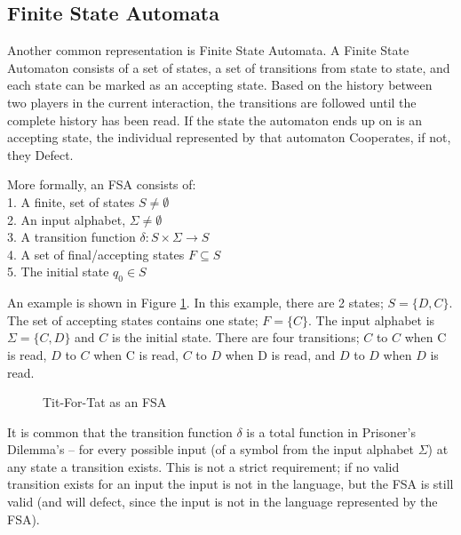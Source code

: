 \documentclass[a4paper,11pt,bcshonoursthesis,singlespace,oneside,thesisdraft,pdflatex]{cssethesis}
\begin{document}
\subsection{Finite State Automata}
\label{sec:fsa}
Another common representation is Finite State Automata. 
A Finite State Automaton consists of a set of states, a set of transitions from state to state, and each state can be marked as an accepting state. 
Based on the history between two players in the current interaction, the transitions are followed until the complete history has been read. 
If the state the automaton ends up on is an accepting state, the individual represented by that automaton Cooperates, if not, they Defect. 

More formally, an FSA consists of:\\
1. A finite, set of states $S \neq  \emptyset$\\
2. An input alphabet, $\Sigma \neq  \emptyset$\\
3. A transition function $\delta : S \times \Sigma \rightarrow S$\\
4. A set of final/accepting states $F \subseteq S$ \\
5. The initial state $q_0 \in S$

An example is shown in Figure \ref{fig:fsa.tft.lang2}. 
In this example, there are 2 states; $S=\{D,C\}$. 
The set of accepting states contains one state; $F=\{C\}$. 
The input alphabet is $\Sigma=\{C,D\}$ and $C$ is the initial state. 
There are four transitions; $C$ to $C$ when C is read, $D$ to $C$ when C is read, $C$ to $D$ when D is read, and $D$ to $D$ when $D$ is read.

\begin{figure}[h]
\center
{}
\caption{Tit-For-Tat as an FSA}
\label{fig:fsa.tft.lang2}
\end{figure}

It is common that the transition function $\delta$ is a total function in Prisoner's Dilemma's -- for every possible input (of a symbol from the input alphabet $\Sigma$) at any state a transition exists. 
This is not a strict requirement; if no valid transition exists for an input the input is not in the language, but the FSA is still valid (and will defect, since the input is not in the language represented by the FSA). 
\end{document}
